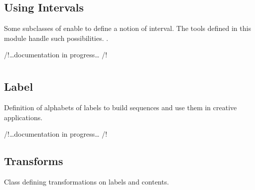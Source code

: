 \documentclass[letterpaper,10pt,english]{sphinxmanual}
\begin{document}
\begin{fulllineitems}
\begin{sphinxVerbatim}[commandchars=\\\{\}]
   
    
\end{sphinxVerbatim}

\end{fulllineitems}

\label{\detokenize{index:module-Intervals}}

\section{Using Intervals}
\label{\detokenize{index:using-intervals}}
Some subclasses of  enable to define a notion of interval. The tools defined in this module handle such possibilities.
 .

/!…documentation in progress… /!


\chapter{}
\label{\detokenize{index:event-label-transformation}}\label{\detokenize{index:module-Label}}

\section{Label}
\label{\detokenize{index:label}}
Definition of alphabets of labels to build sequences and use them in creative applications.

/!…documentation in progress… /!
\label{\detokenize{index:module-Transforms}}

\section{Transforms}
\label{\detokenize{index:transforms}}
Class defining transformations on labels and contents.
\end{document}
